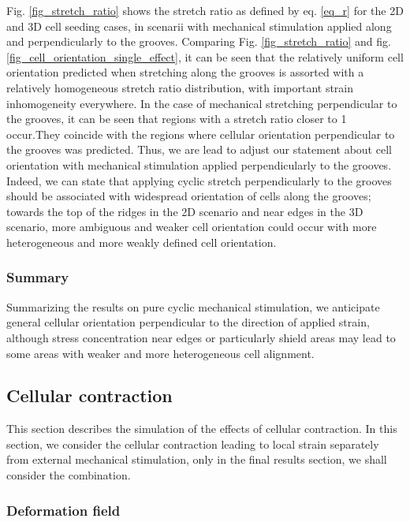 \documentclass[11pt]{amsart}
\begin{document}
Fig. \ref{fig_stretch_ratio} shows the stretch ratio as defined by eq. \ref{eq_r} for the 2D and 3D cell seeding cases, in scenarii with mechanical stimulation applied along and perpendicularly to the grooves. Comparing Fig. \ref{fig_stretch_ratio} and fig. \ref{fig_cell_orientation_single_effect}, it can be seen that the relatively uniform cell orientation predicted when stretching along the grooves is assorted with a relatively homogeneous stretch ratio distribution, with important strain inhomogeneity everywhere. In the case of mechanical stretching perpendicular to the grooves, it can be seen that regions with a stretch ratio closer to 1 occur.They coincide with the regions where cellular orientation perpendicular to the grooves was predicted. Thus, we are lead to adjust our statement about cell orientation with mechanical stimulation applied perpendicularly to the grooves. Indeed, we can state that applying cyclic stretch perpendicularly to the grooves should be associated with widespread orientation of cells along the grooves; towards the top of the ridges in the 2D scenario and near edges in the 3D scenario, more ambiguous and weaker cell orientation could occur with more heterogeneous and more weakly defined cell orientation. 


\subsubsection{Summary}

Summarizing the results on pure cyclic mechanical stimulation, we anticipate general cellular orientation perpendicular to the direction of applied strain, although stress concentration near edges or particularly shield areas may lead to some areas with weaker and more heterogeneous cell alignment. 


\subsection{Cellular contraction}

This section describes the simulation of the effects of cellular contraction. In this section, we consider the cellular contraction leading to local strain separately from external mechanical stimulation, only in the final results section, we shall consider the combination.


\subsubsection{Deformation field}
\end{document}
